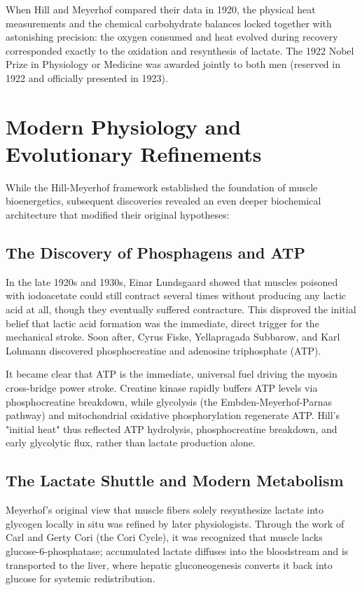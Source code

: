 When Hill and Meyerhof compared their data in 1920, the physical heat measurements and the chemical carbohydrate balances locked together with astonishing precision: the oxygen consumed and heat evolved during recovery corresponded exactly to the oxidation and resynthesis of lactate. The 1922 Nobel Prize in Physiology or Medicine was awarded jointly to both men (reserved in 1922 and officially presented in 1923).

\section{Modern Physiology and Evolutionary Refinements}

While the Hill-Meyerhof framework established the foundation of muscle bioenergetics, subsequent discoveries revealed an even deeper biochemical architecture that modified their original hypotheses:

\subsection{The Discovery of Phosphagens and ATP}
In the late 1920s and 1930s, Einar Lundsgaard showed that muscles poisoned with iodoacetate could still contract several times without producing any lactic acid at all, though they eventually suffered contracture. This disproved the initial belief that lactic acid formation was the immediate, direct trigger for the mechanical stroke. Soon after, Cyrus Fiske, Yellapragada Subbarow, and Karl Lohmann discovered phosphocreatine and adenosine triphosphate (ATP). 

It became clear that ATP is the immediate, universal fuel driving the myosin cross-bridge power stroke. Creatine kinase rapidly buffers ATP levels via phosphocreatine breakdown, while glycolysis (the Embden-Meyerhof-Parnas pathway) and mitochondrial oxidative phosphorylation regenerate ATP. Hill's "initial heat" thus reflected ATP hydrolysis, phosphocreatine breakdown, and early glycolytic flux, rather than lactate production alone.

\subsection{The Lactate Shuttle and Modern Metabolism}
Meyerhof's original view that muscle fibers solely resynthesize lactate into glycogen locally in situ was refined by later physiologists. Through the work of Carl and Gerty Cori (the Cori Cycle), it was recognized that muscle lacks glucose-6-phosphatase; accumulated lactate diffuses into the bloodstream and is transported to the liver, where hepatic gluconeogenesis converts it back into glucose for systemic redistribution. 

